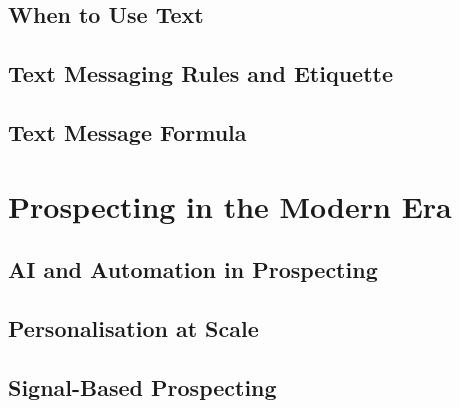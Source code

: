     \subsection{When to Use Text}\mbox{}
    \subsection{Text Messaging Rules and Etiquette}\mbox{}
    \subsection{Text Message Formula}\mbox{}

\section{Prospecting in the Modern Era}\mbox{}
    \subsection{AI and Automation in Prospecting}\mbox{}
    \subsection{Personalisation at Scale}\mbox{}
    \subsection{Signal-Based Prospecting}\mbox{}

\printbibliography[heading=secbibliography, title={References}]
